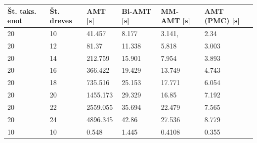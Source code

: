 \documentclass[a4paper, 12pt]{book}
\begin{document}
\begin{table}[h!]
	\begin{center}
	{\footnotesize
	\begin{tabular}{ l| l | l | l | l | l }
	
	Št. taks. enot & Št. dreves & AMT [s]     & Bi-AMT [s] & MM-AMT [s]   & AMT (PMC) [s]  \\ \hline
	20             & 10         & 41.457      & 8.177      & 3.141,    & 2.34       \\ \hline
	20             & 12         & 81.37       & 11.338    & 5.818     & 3.003      \\ \hline
	20             & 14         & 212.759     & 15.901    & 7.954     & 3.893      \\ \hline
	20             & 16         & 366.422     & 19.429    & 13.749    & 4.743      \\ \hline
	20             & 18         & 735.516     & 25.153    & 17.771    & 6.054      \\ \hline
	20             & 20         & 1455.173    & 29.329    & 16.85     & 7.192      \\ \hline
	20             & 22         & 2559.055    & 35.694    & 22.479    & 7.565      \\ \hline 
	20             & 24         & 4896.345    & 42.86     & 27.536    & 8.779      \\ \hline
	\hline
	10             & 10         & 0.548       & 1.445     & 0.4108    & 0.355        \\ \hline

\end{tabular}}
\end{center}
\end{table}
\end{document}
